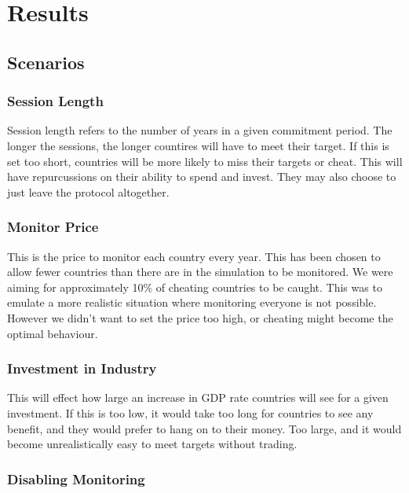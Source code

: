 \section{Results}

%
%

\subsection{Scenarios}

%
%

\subsubsection{Session Length}

Session length refers to the number of years in a given commitment period. The longer the sessions, the longer countires will have to meet their target. If this is set too short, countries will be more likely to miss their targets or cheat. This will have repurcussions on their ability to spend and invest. They may also choose to just leave the protocol altogether.

\subsubsection{Monitor Price}

This is the price to monitor each country every year. This has been chosen to allow fewer countries than there are in the simulation to be monitored. We were aiming for approximately 10\% of cheating countries to be caught. This was to emulate a more realistic situation where monitoring everyone is not possible. However we didn't want to set the price too high, or cheating might become the optimal behaviour.

\subsubsection{Investment in Industry}

This will effect how large an increase in GDP rate countries will see for a given investment. If this is too low, it would take too long for countries to see any benefit, and they would prefer to hang on to their money. Too large, and it would become unrealistically easy to meet targets without trading.

\subsubsection{Disabling Monitoring}

